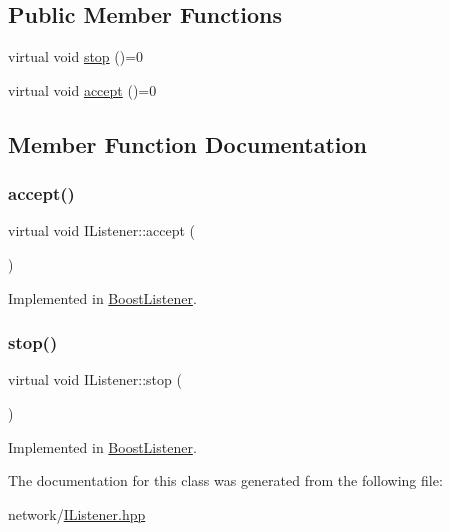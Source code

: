 \subsection*{Public Member Functions}
\begin{DoxyCompactItemize}
\item 
virtual void \mbox{\hyperlink{classIListener_a288f3ad930bc90086f4e8b6578609366}{stop}} ()=0
\item 
virtual void \mbox{\hyperlink{classIListener_a332f291fb10f7dadc223fe6c9a98a7cc}{accept}} ()=0
\end{DoxyCompactItemize}


\subsection{Member Function Documentation}
\mbox{\label{classIListener_a332f291fb10f7dadc223fe6c9a98a7cc}} 
\subsubsection{\texorpdfstring{accept()}{accept()}}
{\footnotesize\ttfamily virtual void I\+Listener\+::accept (\begin{DoxyParamCaption}{ }\end{DoxyParamCaption})\hspace{0.3cm}{\ttfamily [pure virtual]}}



Implemented in \mbox{\hyperlink{classBoostListener_a8a2849f0e1c513750bc74cb9a2c0d428}{Boost\+Listener}}.

\mbox{\label{classIListener_a288f3ad930bc90086f4e8b6578609366}} 
\subsubsection{\texorpdfstring{stop()}{stop()}}
{\footnotesize\ttfamily virtual void I\+Listener\+::stop (\begin{DoxyParamCaption}{ }\end{DoxyParamCaption})\hspace{0.3cm}{\ttfamily [pure virtual]}}



Implemented in \mbox{\hyperlink{classBoostListener_af83620fe2b6644903a6f631b8df2fd2d}{Boost\+Listener}}.



The documentation for this class was generated from the following file\+:\begin{DoxyCompactItemize}
\item 
network/\mbox{\hyperlink{IListener_8hpp}{I\+Listener.\+hpp}}\end{DoxyCompactItemize}
